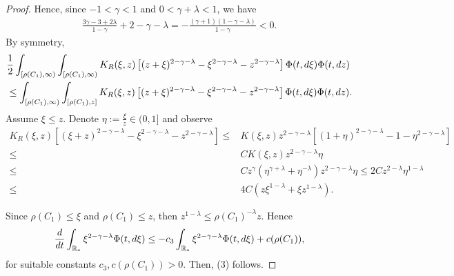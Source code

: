 \documentclass[10pt,a4paper]{amsart}
\newcommand{\der}{\textup{d}}
\begin{document}
\begin{proof}
Hence, since $-1 < \gamma <1$ and $0 < \gamma + \lambda <1 $, we have
\begin{align*}
    \frac{3\gamma-3+2\lambda}{1-\gamma} + 2-\gamma -\lambda=- \frac{(\gamma+1)(1-\gamma-\lambda)}{1-\gamma } <0.
    \end{align*}
By symmetry, 
\begin{align*}
   &\frac{1}{2}\int_{[ \rho(C_1), \infty)} \int_{[ \rho(C_1), \infty)}K_R(\xi,z) \left[(z+\xi)^{2-\gamma -\lambda }- \xi^{2-\gamma -\lambda}-z^{2-\gamma -\lambda} \right] \Phi(t, \der\xi)\Phi(t,\der z) \\
   &\leq  \int_{[ \rho(C_1), \infty)} \int_{[\rho(C_1), z]} K_R(\xi,z) \left[(z+\xi)^{2-\gamma -\lambda }- \xi^{2-\gamma -\lambda}-z^{2-\gamma -\lambda} \right] \Phi(t,\der  \xi)\Phi(t,\der z).
\end{align*}
Assume $\xi\leq z$.  Denote $\eta:=\frac{\xi}{z}\in(0,1]$ and observe
\begin{align}\label{moments larger than one}
K_{R}(\xi,z)[(\xi+z)^{2-\gamma-\lambda}-\xi^{2-\gamma-\lambda}-z^{2-\gamma-\lambda}]\leq & K(\xi,z) z^{2-\gamma-\lambda}[(1+\eta)^{2-\gamma-\lambda}-1-\eta^{2-\gamma-\lambda}]\nonumber\\
\leq & C   K(\xi,z)z^{2-\gamma-\lambda}\eta \nonumber \nonumber\\
\leq& C z^{\gamma}(\eta^{\gamma+\lambda}+\eta^{-\lambda}) z^{2-\gamma-\lambda}\eta \leq 2C z^{2-\lambda}\eta^{1-\lambda}\nonumber \\
\leq & 4C (z\xi^{1-\lambda}+\xi z^{1-\lambda}).
\end{align}

Since $\rho(C_1)\leq \xi$ and $\rho(C_1)\leq z$, then $z^{1-\lambda}\leq\rho(C_1)^{-\lambda}z$. Hence 
\[
\frac{d }{dt } \int_{\mathbb R_*} \xi^{2-\gamma-\lambda} \Phi(t, \der \xi) \leq - c_3 \int_{\mathbb R_*} \xi^{2-\gamma-\lambda} \Phi(t, \der \xi) + c(\rho(C_1)),
\]
for suitable constants $c_3, c(\rho(C_1))>0$. Then, (3) follows.
\end{proof}
\end{document}

